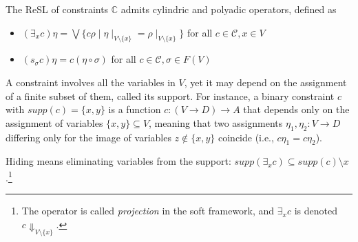 \documentclass{llncs}
\begin{document}
{\begin{lemma}
	The ReSL of constraints $\mathbb{C}$ admits cylindric and polyadic operators, defined as
	\begin{itemize}
		\item  $(\exists_x c) \eta = \bigvee \{c \rho \mid \eta\mid_{V \setminus \{x\}} = 
		\rho\mid_{V \setminus \{x\}}\}$ for all $c \in {\mathcal C}, x \in V$
		\item  $(s_\sigma c) \eta = c (\eta \circ \sigma)$ for all $c \in {\mathcal C}, \sigma \in F(V)$	
	\end{itemize}
\end{lemma}


A constraint involves all the variables in $V$, yet it may depend on
the assignment of a finite subset of them, called its support. For
instance, a binary constraint $c$ with $supp(c)=\{x,y\}$ is a function
$c: (V\rightarrow D)\rightarrow A$ that depends only on the
assignment of variables $\{x,y\}\subseteq V$, meaning that two
assignments $\eta_1, \eta_2: V \rightarrow D$ differing only for the
image of variables $z \not \in \{x,y\}$ coincide (i.e., $c\eta_1 =
c\eta_2$).
%


Hiding means eliminating variables from the support:
$supp(\exists_x c) \subseteq supp({c}) \setminus {x}$.\footnote{The operator
	is called \emph{projection} in the soft framework,
	and $\exists_x c$ is denoted $c\Downarrow_{V\setminus \{x\}}$.}
}
\end{document}
